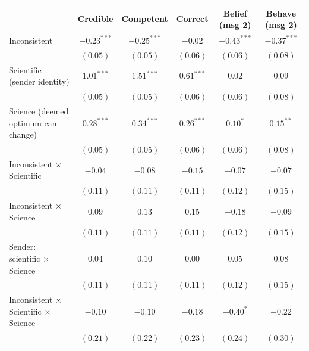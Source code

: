 
\begin{table}
\begin{center}
\begin{tabular}{l c c c c c}
\hline
 & Credible & Competent & Correct & Belief (msg 2) & Behave (msg 2) \\
\hline
Inconsistent                                      & $-0.23^{***}$ & $-0.25^{***}$ & $-0.02$      & $-0.43^{***}$ & $-0.37^{***}$ \\
                                                  & $(0.05)$      & $(0.05)$      & $(0.06)$     & $(0.06)$      & $(0.08)$      \\
Scientific (sender identity)                      & $1.01^{***}$  & $1.51^{***}$  & $0.61^{***}$ & $0.02$        & $0.09$        \\
                                                  & $(0.05)$      & $(0.05)$      & $(0.06)$     & $(0.06)$      & $(0.08)$      \\
Science (deemed optimum can change)               & $0.28^{***}$  & $0.34^{***}$  & $0.26^{***}$ & $0.10^{*}$    & $0.15^{**}$   \\
                                                  & $(0.05)$      & $(0.05)$      & $(0.06)$     & $(0.06)$      & $(0.08)$      \\
Inconsistent $\times$ Scientific                  & $-0.04$       & $-0.08$       & $-0.15$      & $-0.07$       & $-0.07$       \\
                                                  & $(0.11)$      & $(0.11)$      & $(0.11)$     & $(0.12)$      & $(0.15)$      \\
Inconsistent $\times$ Science                     & $0.09$        & $0.13$        & $0.15$       & $-0.18$       & $-0.09$       \\
                                                  & $(0.11)$      & $(0.11)$      & $(0.11)$     & $(0.12)$      & $(0.15)$      \\
Sender: scientific $\times$ Science               & $0.04$        & $0.10$        & $0.00$       & $0.05$        & $0.08$        \\
                                                  & $(0.11)$      & $(0.11)$      & $(0.11)$     & $(0.12)$      & $(0.15)$      \\
Inconsistent $\times$ Scientific $\times$ Science & $-0.10$       & $-0.10$       & $-0.18$      & $-0.40^{*}$   & $-0.22$       \\
                                                  & $(0.21)$      & $(0.22)$      & $(0.23)$     & $(0.24)$      & $(0.30)$      \\

\end{tabular}
\end{center}
\end{table}
